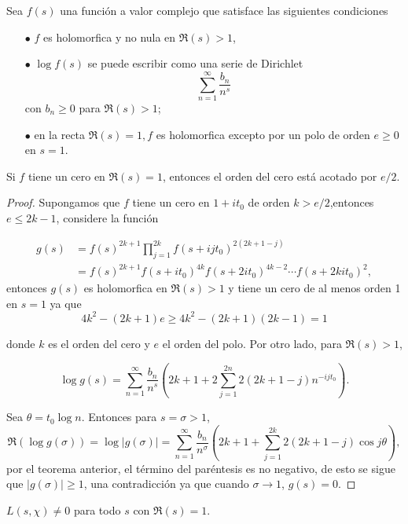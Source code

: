 \begin{theorem}[K. Murty]
Sea $f(s)$ una función a valor complejo que satisface las siguientes condiciones

\begin{itemize}
    \item[$\bullet$] $f$ es holomorfica y no nula en $\Re(s)>1$,
    \item[$\bullet$] $\log f(s)$ se puede escribir como una serie de Dirichlet
    $$
    \sum_{n=1}^{\infty} \frac{b_n}{n^s}
    $$
    con $b_n \geq 0$ para $\Re(s)>1$;
    \item[$\bullet$] en la recta $\Re(s)=1, f$ es holomorfica excepto por un polo de orden $e \geq 0$ en $s=1$.
\end{itemize} 

Si $f$ tiene un cero en $\Re(s)=1$, entonces el orden del cero está acotado por $e/2$.
\end{theorem}

\begin{proof}
    Supongamos que $f$ tiene un cero en $1+it_0$ de orden $k>e/2$,entonces $e\leq2k-1$, considere la función

    $$\begin{aligned}
g(s) & =f(s)^{2 k+1} \prod_{j=1}^{2 k} f\left(s+i j t_0\right)^{2(2 k+1-j)} \\
& =f(s)^{2 k+1} f\left(s+i t_0\right)^{4 k} f\left(s+2 i t_0\right)^{4 k-2} \cdots f\left(s+2 k i t_0\right)^2,
\end{aligned}$$
entonces $g(s)$ es holomorfica en $\Re(s)>1$ y tiene un cero de al menos orden 1 en $s=1$ ya que 
$$
4 k^2-(2 k+1) e \geq 4 k^2-(2 k+1)(2 k-1)=1
$$

donde $k$ es el orden del cero y $e$ el orden del polo. Por otro lado, para $\Re(s)>1$,

$$
\log g(s)=\sum_{n=1}^{\infty} \frac{b_n}{n^s}\left(2 k+1+2 \sum_{j=1}^{2 n} 2(2 k+1-j) n^{-i j t_0}\right) .
$$

Sea $\theta=t_0 \log n$. Entonces para $s=\sigma>1$,
$$\Re (\log g(\sigma))=\log |g(\sigma)|=\sum_{n=1}^{\infty} \frac{b_n}{n^\sigma}\left(2 k+1+\sum_{j=1}^{2 k} 2(2 k+1-j) \cos j \theta\right),$$
por el teorema anterior, el término del paréntesis es no negativo, de esto se sigue que $|g(\sigma)|\geq 1$, una contradicción ya que cuando $\sigma\to 1$, $g(s)=0$.
\end{proof}

\begin{theorem}
    $L(s,\chi)\neq 0$ para todo $s$ con $\Re(s)=1$.
\end{theorem}

